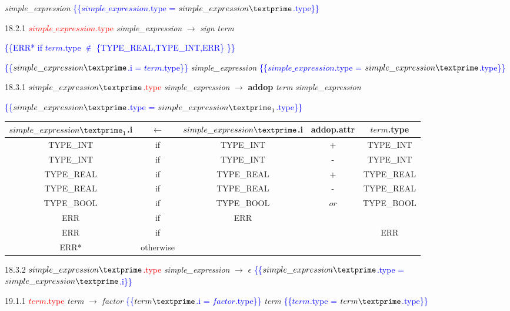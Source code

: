 \emph{simple\_expression\textprime} \textcolor{blue}{\{\{$simple\_expression$.type = $simple\_expression\textprime$.type\}\}}

18.2.1 \textcolor{red}{$simple\_expression$.type} \emph{simple\_expression} $\rightarrow$ \emph{sign} \emph{term}

\textcolor{blue}{\{\{ERR* if $term$.type $\notin$ \{TYPE_REAL,TYPE_INT,ERR\} \}\}}

\textcolor{blue}{\{\{$simple\_expression\textprime$.i = $term$.type\}\}}
 \emph{simple\_expression\textprime} \textcolor{blue}{\{\{$simple\_expression$.type = $simple\_expression\textprime$.type\}\}}

 18.3.1  \textcolor{red}{$simple\_expression\textprime$.type} \emph{simple\_expression\textprime} $\rightarrow$ \textbf{addop} \emph{term} \emph{simple\_expression\textprime}

 \textcolor{blue}{\{\{$simple\_expression\textprime$.type = $simple\_expression\textprime_1$.type\}\}}

\begin{tabular}[t]{|c|c|c|c|c|}
  \hline

 $simple\_expression\textprime_1$.i & \textbf{$\leftarrow$} & $simple\_expression\textprime$.i & \textbf{addop}.attr &  $term$.type \\

  \hline

  TYPE_INT & if & TYPE_INT & + & TYPE_INT \\
  TYPE_INT & if & TYPE_INT & - & TYPE_INT \\
  TYPE_REAL & if & TYPE_REAL & + & TYPE_REAL \\
  TYPE_REAL & if & TYPE_REAL & - & TYPE_REAL \\
  TYPE_BOOL & if & TYPE_BOOL & $or$ & TYPE_BOOL \\
  ERR & if & ERR & & \\
  ERR & if & & & ERR \\
  ERR* & otherwise & & & \\
  \hline

\end{tabular}

18.3.2 \textcolor{red}{$simple\_expression\textprime$.type} \emph{simple\_expression\textprime} $\rightarrow$ $\epsilon$ \textcolor{blue}{\{\{$simple\_expression\textprime$.type = $simple\_expression\textprime$.i\}\}}

19.1.1 \textcolor{red}{$term$.type} \emph{term} $\rightarrow$ \emph{factor} \textcolor{blue}{\{\{$term\textprime$.i = $factor$.type\}\}} \emph{term\textprime} \textcolor{blue}{\{\{$term$.type = $term\textprime$.type\}\}}


